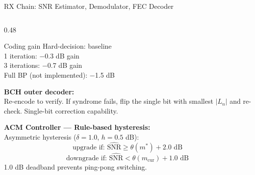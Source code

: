 \documentclass[aspectratio=169,10pt]{beamer}
\begin{document}
\begin{frame}[shrink=15]{RX Chain: SNR Estimator, Demodulator, FEC Decoder}
\begin{columns}[T]
\begin{column}{0.48\textwidth}
      \begin{keybox}{Coding gain}
        \scriptsize Hard-decision: baseline\\
        1 iteration: $-$0.3 dB gain\\
        3 iterations: $-$0.7 dB gain\\
        Full BP (not implemented): $-$1.5 dB
      \end{keybox}

      \vspace{0.2em}
      \textbf{BCH outer decoder:}\\
      \scriptsize Re-encode to verify. If syndrome fails, flip the single bit with smallest
      $|L_n|$ and re-check. Single-bit correction capability.

      \vspace{0.2em}
      \textbf{ACM Controller — Rule-based hysteresis:}\\
      \scriptsize Asymmetric hysteresis ($\delta=1.0$, $h=0.5$ dB):
      \[\text{upgrade if: }\hat{\text{SNR}} \geq \theta(m^*)+2.0\text{ dB}\]
      \[\text{downgrade if: }\hat{\text{SNR}} < \theta(m_\text{cur})+1.0\text{ dB}\]
      1.0 dB deadband prevents ping-pong switching.
    \end{column}
  \end{columns}
\end{frame}
\end{document}
